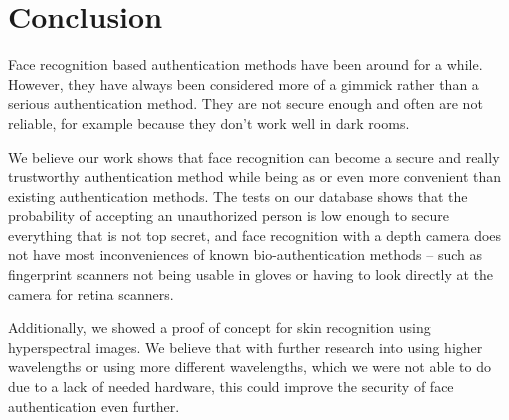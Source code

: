 \section{Conclusion}
    Face recognition based authentication methods have been around for a while. However,
    they have always been considered more of a gimmick rather than a serious
    authentication method. They are not secure enough and often are not reliable,
    for example because they don't work well in dark rooms.

    We believe our work shows that face recognition can become a secure and
    really trustworthy authentication method while being as or even more
    convenient than existing authentication methods.
    The tests on our database shows that the probability of accepting
    an unauthorized person is low enough to secure everything that is not top secret,
    and face recognition with a depth camera does not have most inconveniences
    of known bio-authentication methods -- such as fingerprint scanners not
    being usable in gloves or having to look directly at the camera for
    retina scanners.

    Additionally, we showed a proof of concept for skin recognition using
    hyperspectral images. We believe that with further research into
    using higher wavelengths or using more different wavelengths,
    which we were not able to do due to a lack of needed hardware,
    this could improve the security of face authentication even further.

